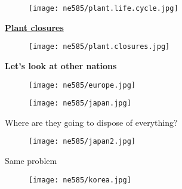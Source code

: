 \documentclass[aspectratio=1610,pdftex,dvipsnames,compress,xcolor={dvipsnames}]{beamer}
\begin{document}
\addtocounter{framenumber}{-1} 
\begin{frame}{}
    \begin{figure}
        \centering
        \texttt{[image: ne585/plant.life.cycle.jpg]}
    \end{figure}
\end{frame}


\begin{frame}[plain]{}
    \centering\LARGE\textbf{\href{https://uidaho.pressbooks.pub/nuclearengineering/chapter/fuel-cycle-overview/}{Plant closures}}
\end{frame}


\addtocounter{framenumber}{-1} 
\begin{frame}{}
    \begin{figure}
        \centering
        \texttt{[image: ne585/plant.closures.jpg]}
    \end{figure}
\end{frame}


\begin{frame}[plain]{}
    \centering\LARGE\textbf{Let's look at other nations}
\end{frame}


\addtocounter{framenumber}{-1} 
\begin{frame}{}
    \begin{figure}
        \centering
        \texttt{[image: ne585/europe.jpg]}
    \end{figure}
\end{frame}


\begin{frame}{}
    \begin{figure}
        \centering
        \texttt{[image: ne585/japan.jpg]}
    \end{figure}
\end{frame}


\begin{frame}{Where are they going to dispose of everything?}
    \begin{figure}
        \centering
        \texttt{[image: ne585/japan2.jpg]}
    \end{figure}
\end{frame}


\begin{frame}{Same problem}
    \begin{figure}
        \centering
        \texttt{[image: ne585/korea.jpg]}
    \end{figure}
\end{frame}
\end{document}
